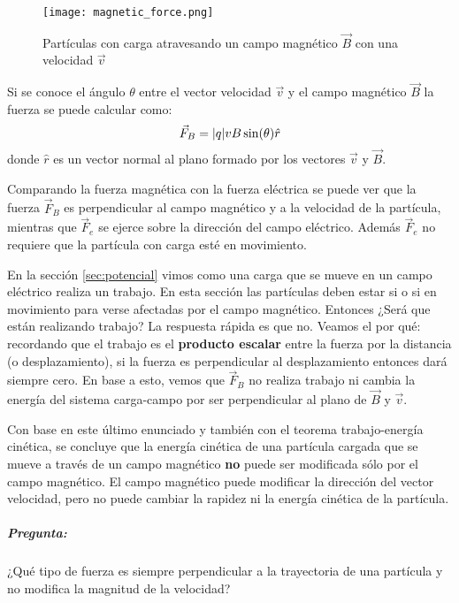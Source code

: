\begin{figure}[ht]
  \centering
  \texttt{[image: magnetic\_force.png]}
  \caption{Partículas con carga atravesando un campo magnético \(\vec{B}\) con una velocidad \(\vec{v}\)}
\end{figure}

Si se conoce el ángulo \(\theta\) entre el vector velocidad \(\vec{v}\) y el campo magnético \(\vec{B}\) la fuerza se puede calcular como:
\[
  \vec{F}_B = \abs{q} v B \sin(\theta) \hat{r}
\]
donde \(\hat{r}\) es un vector normal al plano formado por los vectores \(\vec{v}\) y \(\vec{B}\). 

Comparando la fuerza magnética con la fuerza eléctrica se puede ver que la fuerza \(\vec{F}_B\) es perpendicular al campo magnético y a la velocidad de la partícula, mientras que \(\vec{F}_e\) se ejerce sobre la dirección del campo eléctrico. Además \(\vec{F}_e\) no requiere que la partícula con carga esté en movimiento. 

En la sección \ref{sec:potencial} vimos como una carga que se mueve en un campo eléctrico realiza un trabajo. En esta sección las partículas deben estar si o si en movimiento para verse afectadas por el campo magnético. Entonces ¿Será que están realizando trabajo? La respuesta rápida es que no. Veamos el por qué: recordando que el trabajo es el \textbf{producto escalar} entre la fuerza por la distancia (o desplazamiento), si la fuerza es perpendicular al desplazamiento entonces dará siempre cero.
En base a esto, vemos que \(\vec{F}_B\) no realiza trabajo ni cambia la energía del sistema carga-campo por ser perpendicular al plano de \(\vec{B}\) y \(\vec{v}\). 

\begin{tcolorbox}[myconclusion]
  Con base en este último enunciado y también con el teorema trabajo-energía cinética, se concluye que la energía cinética de una partícula cargada que se mueve a través de un campo magnético \textbf{no} puede ser modificada sólo por el campo magnético. El campo magnético puede modificar la dirección del vector velocidad, pero no puede cambiar la rapidez ni la energía cinética de la partícula.
\end{tcolorbox}

\subparagraph{Pregunta:}

\noindent ¿Qué tipo de fuerza es siempre perpendicular a la trayectoria de una partícula y no modifica la magnitud de la velocidad?

\vspace{3pt}

